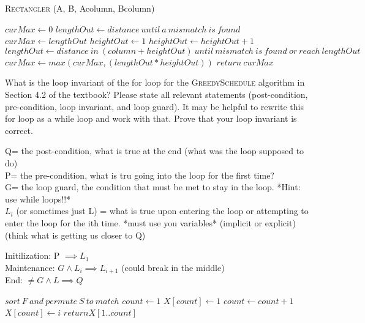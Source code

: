 \documentclass{article}
\begin{document}
\begin{algorithm} \caption{\textsc{Rectangler} (A, B, Acolumn, Bcolumn)}\label{alg:seb}
    \begin{algorithmic}[1]
        \State$curMax \gets 0$
        \State$lengthOut \gets distance\ until\ a\ mismatch\ is\ found$
        \State$curMax \gets lengthOut$
        \State$heightOut \gets 1$
            \State$heightOut \gets heightOut + 1$
            \State$lengthOut \gets distance\ in\ (column + heightOut)\ until\ mismatch\ is\ found\ or\ reach\ lengthOut$
            \State$curMax \gets max(curMax, (lengthOut * heightOut))$
        \EndWhile{}
        \State$return\ curMax$
    \end{algorithmic}
\end{algorithm}

\collab{}

What is the loop invariant of the for loop for the \textsc{GreedySchedule}
algorithm in Section 4.2 of the textbook?  Please state all relevant statements
(post-condition, pre-condition, loop invariant, and loop guard).  It may be
helpful to rewrite this for loop as a while loop and work with that.  Prove that
your loop invariant is correct.

Q= the post-condition, what is true at the end (what was the loop supposed to do) \\
P= the pre-condition, what is tru going into the loop for the first time? \\
G= the loop guard, the condition that must be met to stay in the loop. *Hint: use while loops!!* \\
$L_{i}$ (or sometimes just L) = what is true upon entering the loop or attempting to enter the loop for the ith time. *must use you variables* (implicit or explicit) (think what is getting us closer to Q)

Initilization: P $\implies L_{1}$ \\
Maintenance: $G \wedge L_{i} \implies L_{i+1}$ (could break in the middle) \\
End: $\neq G \wedge L \implies Q$

\begin{algorithmic}[1]
    \State$ sort\ F\ and\ permute\ S\ to\ match$
    \State$ count \gets 1$
    \State$ X [count] \gets 1$
            \State$ count \gets count + 1$
            \State$ X [count] \gets i$
        \EndIf{}
    \EndFor{}
    \State$ return X [1 .. count]$
\end{algorithmic}
\end{document}
